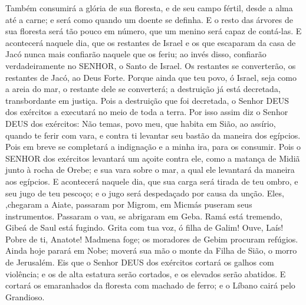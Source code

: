 {Também consumirá a glória de sua floresta, e de seu campo fértil, desde a alma até a carne; e será como quando um doente se definha.
E o resto das árvores de sua floresta será tão pouco em número, que um menino será capaz de contá-las.
E acontecerá naquele dia, que os restantes de Israel e os que escaparam da casa de Jacó nunca mais confiarão naquele que os feriu; ao invés disso, confiarão verdadeiramente no SENHOR, o Santo de Israel.
Os restantes se converterão, os restantes de Jacó, ao Deus Forte.
Porque ainda que teu povo, ó Israel, seja como a areia do mar,
{} o restante dele se converterá; a destruição já está decretada, transbordante em justiça.
Pois a destruição que foi decretada, o Senhor DEUS dos exércitos a executará no meio de toda a terra.
Por isso assim diz o Senhor DEUS dos exércitos: Não temas, povo meu, que habita em Sião, ao assírio, quando te ferir com vara, e contra ti levantar seu bastão da maneira dos egípcios.
Pois em breve se completará a indignação e a minha ira, para os consumir.
Pois o SENHOR dos exércitos levantará um açoite contra ele, como a matança de Midiã junto à rocha de Orebe; e sua vara
{} sobre o mar, a qual ele levantará da maneira
{} aos egípcios.
E acontecerá naquele dia, que sua carga será tirada de teu ombro, e seu jugo de teu pescoço; e o jugo será despedaçado por causa da unção.
Eles,
{} ,chegaram a Aiate, passaram por Migrom, em Micmás puseram seus instrumentos.
Passaram o vau, se abrigaram em Geba. Ramá está tremendo, Gibeá de Saul está fugindo.
Grita com tua voz, ó filha de Galim! Ouve, Laís! Pobre de ti, Anatote!
Madmena foge; os moradores de Gebim procuram refúgios.
Ainda hoje parará em Nobe; moverá sua mão
{} o monte da Filha de Sião, o morro de Jerusalém.
Eis que o Senhor DEUS dos exércitos cortará os galhos com violência; e os de alta estatura serão cortados, e os elevados serão abatidos.
E cortará os emaranhados da floresta com machado de ferro; e o Líbano cairá pelo Grandioso.

}
